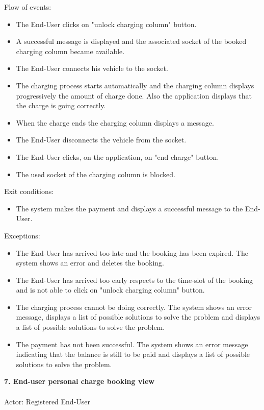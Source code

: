 \documentclass[a4paper]{report}
\begin{document}
Flow of events:
\begin{itemize}
\item The End-User clicks on "unlock charging column" button.
\item A successful message is displayed and the associated socket of the booked charging column became available.
\item The End-User connects his vehicle to the socket.
\item The charging process starts automatically and the charging column displays progressively the amount of charge done. Also the application displays that the charge is going correctly.
\item When the charge ends the charging column displays a message.
\item The End-User disconnects the vehicle from the socket.
\item The End-User clicks, on the application, on "end charge" button.
\item The used socket of the charging column is blocked.
\end{itemize}
Exit conditions:
\begin{itemize}
\item The system makes the payment and displays a successful message to the End-User.
\end{itemize}
Exceptions: 
\begin{itemize}
\item The End-User has arrived too late and the booking has been expired. The system shows an error and deletes the booking.
\item The End-User has arrived too early respects to the time-slot of the booking and is not able to click on "unlock charging column" button.
\item The charging process cannot be doing correctly. The system shows an error message, displays a list of possible solutions to solve the problem and displays a list of possible solutions to solve the problem.
\item The payment has not been successful. The system shows an error message indicating that the balance is still to be paid and displays a list of possible solutions to solve the problem.
\end{itemize}
\textbf{7. End-user personal charge booking view}\label{uc:8}
\\ \\
Actor: Registered End-User \\ \\
\end{document}
